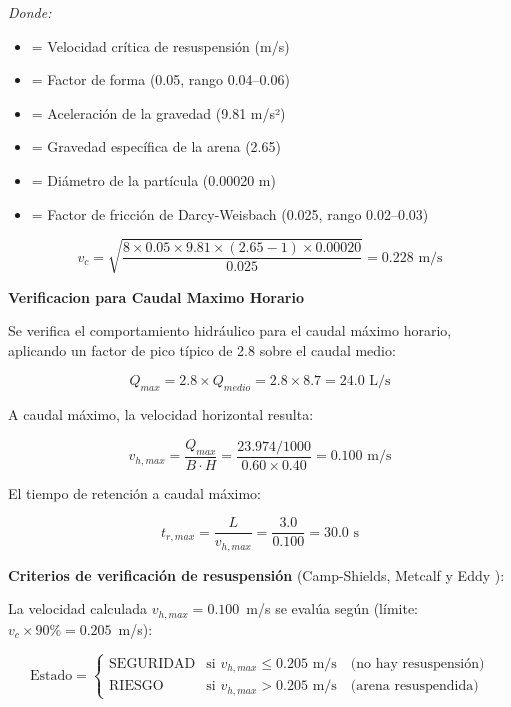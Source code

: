 \documentclass[12pt,a4paper]{article}
\begin{document}
\textit{Donde:}
\begin{itemize}[noitemsep,leftmargin=2em]
    \item[$v_c$] = Velocidad cr\'itica de resuspensi\'on (m/s)
    \item[$\beta$] = Factor de forma (0.05, rango 0.04--0.06)
    \item[$g$] = Aceleraci\'on de la gravedad (9.81 m/s²)
    \item[$S_s$] = Gravedad espec\'ifica de la arena (2.65)
    \item[$d$] = Di\'ametro de la part\'icula (0.00020 m)
    \item[$f$] = Factor de fricci\'on de Darcy-Weisbach (0.025, rango 0.02--0.03)
\end{itemize}

\begin{equation}
v_c = \sqrt{\frac{8 \times 0.05 \times 9.81 \times (2.65 - 1) \times 0.00020}{0.025}} = 0.228 \text{ m/s}
\end{equation}

\textbf{Verificacion para Caudal Maximo Horario}

Se verifica el comportamiento hidr\'aulico para el caudal m\'aximo horario, aplicando un factor de pico t\'ipico de 2.8 sobre el caudal medio:

\begin{equation}
Q_{max} = 2.8 \times Q_{medio} = 2.8 \times 8.7 = 24.0 \text{ L/s}
\end{equation}

A caudal m\'aximo, la velocidad horizontal resulta:

\begin{equation}
v_{h,max} = \frac{Q_{max}}{B \cdot H} = \frac{23.974/1000}{0.60 \times 0.40} = 0.100 \text{ m/s}
\end{equation}

El tiempo de retenci\'on a caudal m\'aximo:

\begin{equation}
t_{r,max} = \frac{L}{v_{h,max}} = \frac{3.0}{0.100} = 30.0 \text{ s}
\end{equation}

\textbf{Criterios de verificaci\'on de resuspensi\'on} (Camp-Shields, Metcalf y Eddy \cite{metcalf2014}):

La velocidad calculada $v_{h,max} = 0.100$~m/s se eval\'ua seg\'un (l\'imite: $v_c \times 90\% = 0.205$~m/s):

\begin{equation}
\text{Estado} = \begin{cases}
    \text{SEGURIDAD} & \text{si } v_{h,max} \leq 0.205 \text{ m/s} \quad \text{(no hay resuspensi\'on)} \\
    \text{RIESGO} & \text{si } v_{h,max} > 0.205 \text{ m/s} \quad \text{(arena resuspendida)}
\end{cases}
\end{equation}
\end{document}
